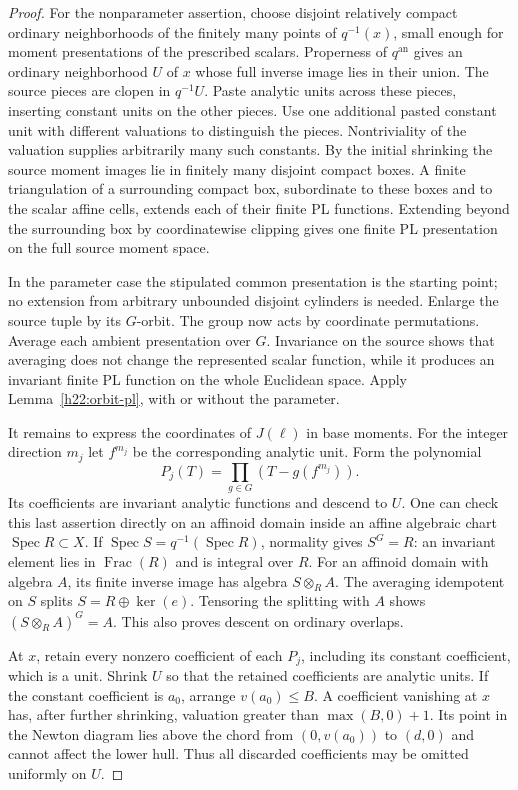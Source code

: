\documentclass[11pt,a4paper]{article}
\theoremstyle{definition}
\theoremstyle{remark}
\newcommand{\an}{\mathrm{an}}
\begin{document}
\begin{proof}
For the nonparameter assertion, choose disjoint relatively compact
ordinary neighborhoods of the finitely many points of $q^{-1}(x)$,
small enough for moment presentations of the prescribed scalars.
Properness of $q^{\an}$ gives an ordinary neighborhood $U$ of $x$
whose full inverse image lies in their union. The source pieces are
clopen in $q^{-1}U$. Paste analytic units across these pieces, inserting
constant units on the other pieces. Use one additional pasted constant
unit with different valuations to distinguish the pieces. Nontriviality
of the valuation supplies arbitrarily many such constants. By the
initial shrinking the source moment images lie in finitely many
disjoint compact boxes. A finite triangulation of a surrounding compact
box, subordinate to these boxes and to the scalar affine cells,
extends each of their finite PL functions. Extending beyond the
surrounding box by coordinatewise clipping gives one finite PL
presentation on the full source moment space.

In the parameter case the stipulated common presentation is the
starting point; no extension from arbitrary unbounded disjoint
cylinders is needed. Enlarge the source tuple by its $G$-orbit.
The group now acts by coordinate permutations. Average each ambient
presentation over $G$. Invariance on the source shows that averaging
does not change the represented scalar function, while it produces
an invariant finite PL function on the whole Euclidean space.
Apply Lemma~\ref{h22:orbit-pl}, with or without the parameter.

It remains to express the coordinates of $J(\ell)$ in base moments.
For the integer direction $m_j$ let $f^{m_j}$ be the corresponding
analytic unit. Form the polynomial
\[
                    P_j(T)=\prod_{g\in G}(T-g(f^{m_j})).
\]
Its coefficients are invariant analytic functions and descend to $U$.
One can check this last assertion directly on an affinoid domain
inside an affine algebraic chart $\operatorname{Spec}R\subset X$.
If $\operatorname{Spec}S=q^{-1}(\operatorname{Spec}R)$, normality
gives $S^G=R$: an invariant element lies in $\operatorname{Frac}(R)$
and is integral over $R$. For an affinoid domain with algebra $A$, its
finite inverse image has algebra $S\otimes_R A$. The averaging
idempotent on $S$ splits $S=R\oplus\ker(e)$. Tensoring the splitting
with $A$ shows $(S\otimes_R A)^G=A$. This also proves descent on
ordinary overlaps.

At $x$, retain every nonzero coefficient of each $P_j$, including its
constant coefficient, which is a unit. Shrink $U$ so that the retained
coefficients are analytic units. If the constant coefficient is
$a_0$, arrange $v(a_0)\leq B$. A coefficient vanishing at $x$ has,
after further shrinking, valuation greater than $\max(B,0)+1$.
Its point in the Newton diagram lies above the chord from
$(0,v(a_0))$ to $(d,0)$ and cannot affect the lower hull. Thus all
discarded coefficients may be omitted uniformly on $U$.


\end{proof}
\end{document}

